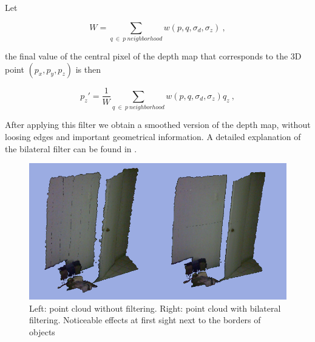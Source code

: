 Let 


$$ W = \sum\limits_{q\ \in\ p\ neighborhood} {w(p,q,\sigma_d,\sigma_z)}\ ,$$

\noindent the final value of the central pixel of the depth map that corresponds to the 3D point $(p_x,p_y,p_z)$ is then

$$p_z' = \frac{1}{W}\sum\limits_{q\ \in\ p\ neighborhood}{w(p,q,\sigma_d,\sigma_z)q_z}\ ,$$


After applying this filter we obtain a smoothed version of the depth map, without loosing edges and important geometrical information.
A detailed explanation of the bilateral filter can be found in \cite{TomasiBilateral}.

\begin{figure}[h!]
\begin{center}
\includegraphics[scale=0.35]{images/bilateral}
\end{center}
\caption{Left: point cloud without filtering. Right: point cloud with bilateral filtering. Noticeable effects at first sight next to the borders of objects}
\end{figure}

